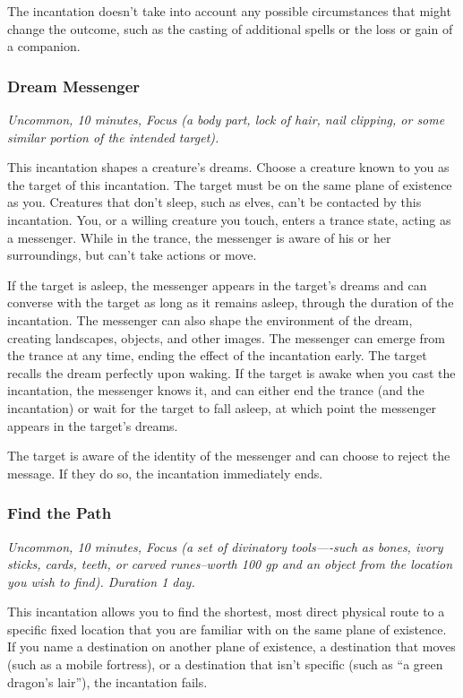 The incantation doesn't take into account any possible circumstances that might change the outcome, such as the casting of additional spells or the loss or gain of a companion.

\subsubsection{Dream Messenger}
\textit{Uncommon, 10 minutes, Focus (a body part, lock of hair, nail clipping, or some similar portion of the intended target).}

This incantation shapes a creature's dreams. Choose a creature known to you as the target of this incantation. The target must be on the same plane of existence as you. Creatures that don't sleep, such as elves, can't be contacted by this incantation. You, or a willing creature you touch, enters a trance state, acting as a messenger. While in the trance, the messenger is aware of his or her surroundings, but can't take actions or move.

If the target is asleep, the messenger appears in the target's dreams and can converse with the target as long as it remains asleep, through the duration of the incantation. The messenger can also shape the environment of the dream, creating landscapes, objects, and other images. The messenger can emerge from the trance at any time, ending the effect of the incantation early. The target recalls the dream perfectly upon waking. If the target is awake when you cast the incantation, the messenger knows it, and can either end the trance (and the incantation) or wait for the target to fall asleep, at which point the messenger appears in the target's dreams.

The target is aware of the identity of the messenger and can choose to reject the message. If they do so, the incantation immediately ends.

\subsubsection{Find the Path}
\textit{Uncommon, 10 minutes, Focus (a set of divinatory tools—-such as bones, ivory sticks, cards, teeth, or carved runes--worth 100 gp and an object from the location you wish to find). Duration 1 day.}

This incantation allows you to find the shortest, most direct physical route to a specific fixed location that you are familiar with on the same plane of existence. If you name a destination on another plane of existence, a destination that moves (such as a mobile fortress), or a destination that isn't specific (such as “a green dragon's lair”), the incantation fails.

